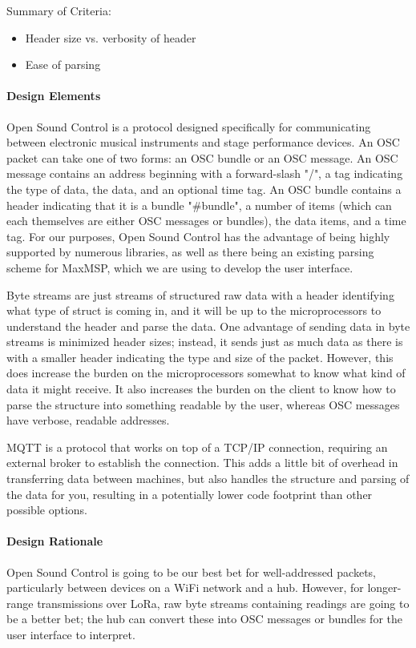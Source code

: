 \documentclass[onecolumn, draftclsnofoot,10pt, compsoc]{IEEEtran}
\begin{document}
    Summary of Criteria:
    \begin{itemize}[noitemsep,topsep=-10pt]
        \item Header size vs. verbosity of header
        \item Ease of parsing
    \end{itemize}

\paragraph{Design Elements}
    Open Sound Control \cite{OSC} is a protocol designed specifically for communicating between electronic musical instruments and stage performance devices. An OSC packet can take one of two forms: an OSC bundle or an OSC message. An OSC message contains an address beginning with a forward-slash "/", a tag indicating the type of data, the data, and an optional time tag. An OSC bundle contains a header indicating that it is a bundle "\#bundle", a number of items (which can each themselves are either OSC messages or bundles), the data items, and a time tag. For our purposes, Open Sound Control has the advantage of being highly supported by numerous libraries, as well as there being an existing parsing scheme for MaxMSP, which we are using to develop the user interface.

    Byte streams are just streams of structured raw data with a header identifying what type of struct is coming in, and it will be up to the microprocessors to understand the header and parse the data. One advantage of sending data in byte streams is minimized header sizes; instead, it sends just as much data as there is with a smaller header indicating the type and size of the packet. However, this does increase the burden on the microprocessors somewhat to know what kind of data it might receive. It also increases the burden on the client to know how to parse the structure into something readable by the user, whereas OSC messages have verbose, readable addresses.

    MQTT \cite{MQTT} is a protocol that works on top of a TCP/IP connection, requiring an external broker to establish the connection. This adds a little bit of overhead in transferring data between machines, but also handles the structure and parsing of the data for you, resulting in a potentially lower code footprint than other possible options. 

\paragraph{Design Rationale}
    Open Sound Control is going to be our best bet for well-addressed packets, particularly between devices on a WiFi network and a hub. However, for longer-range transmissions over LoRa, raw byte streams containing readings are going to be a better bet; the hub can convert these into OSC messages or bundles for the user interface to interpret. 
\end{document}
